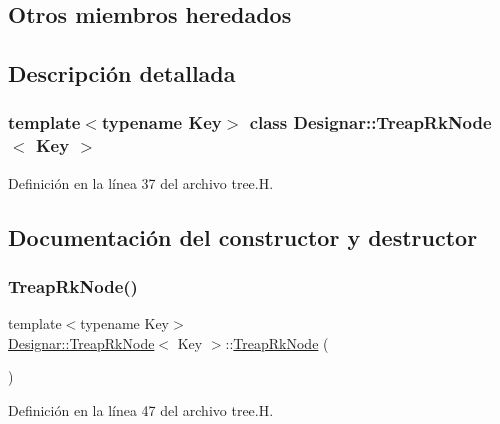 \subsection*{Otros miembros heredados}


\subsection{Descripción detallada}
\subsubsection*{template$<$typename Key$>$\newline
class Designar\+::\+Treap\+Rk\+Node$<$ Key $>$}



Definición en la línea 37 del archivo tree.\+H.



\subsection{Documentación del constructor y destructor}
\mbox{\label{class_designar_1_1_treap_rk_node_a477ff390f32fe63244a0d69fb29fe72d}} 
\subsubsection{\texorpdfstring{Treap\+Rk\+Node()}{TreapRkNode()}\hspace{0.1cm}{\footnotesize\ttfamily [1/4]}}
{\footnotesize\ttfamily template$<$typename Key$>$ \\
\hyperlink{class_designar_1_1_treap_rk_node}{Designar\+::\+Treap\+Rk\+Node}$<$ Key $>$\+::\hyperlink{class_designar_1_1_treap_rk_node}{Treap\+Rk\+Node} (\begin{DoxyParamCaption}{ }\end{DoxyParamCaption})\hspace{0.3cm}{\ttfamily [inline]}}



Definición en la línea 47 del archivo tree.\+H.

\mbox{\label{class_designar_1_1_treap_rk_node_af478d4d739e9f7cacf8337421f3dabcb}} 

